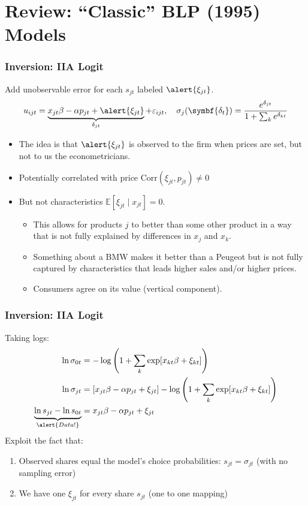 \documentclass[aspectratio=169,10pt]{beamer}
\begin{document}
\section*{Review: ``Classic'' BLP (1995) Models}
\begin{frame}
\frametitle{Inversion: IIA Logit}
Add unobservable error for each $s_{jt}$ labeled $\alert{\xi_{jt}}$.
\begin{align*}
u_{ijt} = \underbrace{x_{jt} \beta -\alpha p_{jt} + \alert{\xi_{jt}}}_{\delta_{jt}} +  \varepsilon_{ijt} , \quad 
\sigma_j(\symbf{\delta_{t}}) = \frac{e^{\delta_{jt}} }{1+\sum_k e^{\delta_{kt}} } 
\end{align*}
\vspace{-0.5cm}
\begin{itemize}
\item The idea is that $\alert{\xi_{jt}}$ is observed to the firm when prices are set, but not to us the econometricians.
\item Potentially correlated with price $\text{Corr}(\xi_{jt},p_{jt}) \neq 0$
\item But not characteristics $\mathbb{E}[\xi_{jt} \mid  x_{jt}]=0$.
\begin{itemize}
\item This allows for products $j$ to better than some other product in a way that is not fully explained by differences in $x_j$ and $x_k$.
\item Something about a BMW makes it better than a Peugeot but is not fully captured by characteristics that leads higher sales and/or higher prices.
\item Consumers agree on its value  (\alert{vertical component}).
\end{itemize}
\end{itemize}
\end{frame}



\begin{frame}
\frametitle{Inversion: IIA Logit}
Taking logs:
\begin{align*}
\ln \sigma_{0t} &= -\log \left(1+\sum_k \exp[x_{kt} \beta + \xi_{kt}] \right) \\
\ln \sigma_{jt} &= [x_{jt} \beta - \alpha p_{jt} +  \xi_{jt} ] - \log \left(1+\sum_k \exp[x_{kt} \beta + \xi_{kt}] \right)\\
\underbrace{\ln s_{jt}- \ln s_{0t}}_{\alert{Data!}} &= x_{jt} \beta -\alpha p_{jt} +  \xi_{jt}
\end{align*}
Exploit the fact that: 
\begin{enumerate}
\item Observed shares equal the model's choice probabilities: $s_{jt} = \sigma_{jt}$ (with no sampling error)
\item We have one $\xi_{jt}$ for every share $s_{jt}$ (one to one mapping)
\end{enumerate}
\end{frame}
\end{document}
